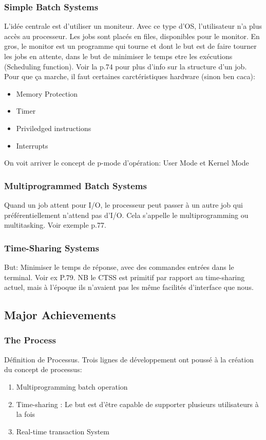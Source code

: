\subsubsection{Simple Batch Systems}
L’idée centrale est d’utiliser un moniteur. Avec ce type d’OS, l’utilisateur n’a plus accès au processeur. Les jobs sont placés en files, disponibles pour le monitor. En gros, le monitor est un programme qui tourne et dont le but est de faire tourner les jobs en attente, dans le but de minimiser le temps etre les exécutions (Scheduling function). Voir la p.74 pour plus d’info sur la structure d’un job.
Pour que ça marche, il faut certaines carctéristiques hardware (sinon ben caca):
\begin{itemize}
\item Memory Protection
\item Timer
\item Priviledged instructions
\item Interrupts
\end{itemize}

On voit arriver le concept de p-mode d’opération: User Mode et Kernel Mode


\subsubsection{Multiprogrammed Batch Systems}
Quand un job attent pour I/O, le processeur peut passer à un autre job qui préférentiellement n’attend pas d’I/O. Cela s’appelle le multiprogramming ou multitasking. Voir exemple p.77.

\subsubsection{Time-Sharing Systems}
But: Minimiser le temps de réponse, avec des commandes entrées dans le terminal. Voir ex P.79. NB le CTSS est primitif par rapport au time-sharing actuel, mais à l’époque ils n’avaient pas les même facilités d’interface que nous.

\subsection{Major Achievements}

\subsubsection{The Process}
Définition de Processus.
Trois lignes de développement ont poussé à la création du concept de processus:
\begin{enumerate}
	\item Multiprogramming batch operation
	\item Time-sharing : Le but est d’être capable de supporter plusieurs utilisateurs à la fois
	\item Real-time transaction System
\end{enumerate}

